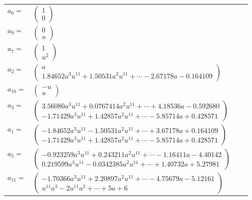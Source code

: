 \documentclass[1p]{elsarticle_modified}
\theoremstyle{definition}
\begin{document}
\begin{tabular}{m{7pt} m{180pt} m{7pt} m{180pt} }
\flushright $a_{6}=$&$\begin{pmatrix}1\\0\end{pmatrix}$ \\
\flushright $a_{9}=$&$\begin{pmatrix}0\\u\end{pmatrix}$ \\
\flushright $a_{7}=$&$\begin{pmatrix}1\\u^2\end{pmatrix}$ \\
\flushright $a_{2}=$&$\begin{pmatrix}a\\1.84652 a^{3} u^{11}+1.50531 a^{2} u^{11}+\cdots-2.67178 a-0.164109\end{pmatrix}$ \\
\flushright $a_{10}=$&$\begin{pmatrix}- u\\u\end{pmatrix}$ \\
\flushright $a_{3}=$&$\begin{pmatrix}3.56080 a^{3} u^{11}+0.0767414 a^{2} u^{11}+\cdots+4.18536 a-0.592680\\-1.71429 a^{3} u^{11}+1.42857 a^{2} u^{11}+\cdots-5.85714 a+0.428571\end{pmatrix}$ \\
\flushright $a_{1}=$&$\begin{pmatrix}-1.84652 a^{3} u^{11}-1.50531 a^{2} u^{11}+\cdots+3.67178 a+0.164109\\-1.71429 a^{3} u^{11}+1.42857 a^{2} u^{11}+\cdots-5.85714 a+0.428571\end{pmatrix}$ \\
\flushright $a_{5}=$&$\begin{pmatrix}-0.923259 a^{3} u^{11}+0.243211 a^{2} u^{11}+\cdots-1.16411 a-4.40142\\0.219599 a^{3} u^{11}-0.0342385 a^{2} u^{11}+\cdots+1.40732 a+5.27981\end{pmatrix}$ \\
\flushright $a_{11}=$&$\begin{pmatrix}-1.70366 a^{3} u^{11}+2.20897 a^{2} u^{11}+\cdots-4.75679 a-5.12161\\u^{11} a^3-2 u^{11} a^2+\cdots+5 a+6\end{pmatrix}$ \\

\end{tabular}
\end{document}
